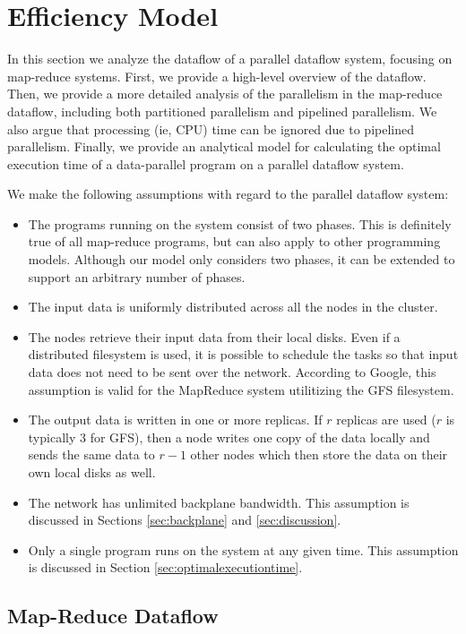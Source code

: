 \documentclass[ 11pt, letterpaper]{article}%
\begin{document}
\section{Efficiency Model}

In this section we analyze the dataflow of a parallel dataflow system, focusing
on map-reduce systems. First, we provide a high-level overview of the dataflow.
Then, we provide a more detailed analysis of the parallelism in the map-reduce
dataflow, including both partitioned parallelism and pipelined parallelism. We
also argue that processing (ie, CPU) time can be ignored due to pipelined
parallelism. Finally, we provide an analytical model for
calculating the optimal execution time of a data-parallel program on a parallel
dataflow system.

We make the following assumptions with regard to the parallel dataflow system:
\begin{itemize}
  \item The programs running on the system consist of two phases. This is
  definitely true of all map-reduce programs, but can also apply to other
  programming models. Although our model only considers two phases, it can be
  extended to support an arbitrary number of phases.
  \item The input data is uniformly distributed across all the nodes in the
  cluster.
  \item The nodes retrieve their input data from their local disks. Even if a
  distributed filesystem is used, it is possible to schedule the tasks so that
  input data does not need to be sent over the network. According to Google,
  this assumption is valid for the MapReduce system utilitizing the GFS
  \cite{gfs} filesystem.
  \item The output data is written in one or more replicas. If $r$ replicas are
  used ($r$ is typically 3 for GFS), then a node writes one copy
  of the data locally and sends the same data to $r - 1$ other nodes which then
  store the data on their own local disks as well.
  \item The network has unlimited backplane bandwidth. This assumption is
  discussed in Sections \ref{sec:backplane} and \ref{sec:discussion}.
  \item Only a single program runs on the system at any given time. This
  assumption is discussed in Section \ref{sec:optimalexecutiontime}.
\end{itemize}

\subsection{Map-Reduce Dataflow}
\end{document}
